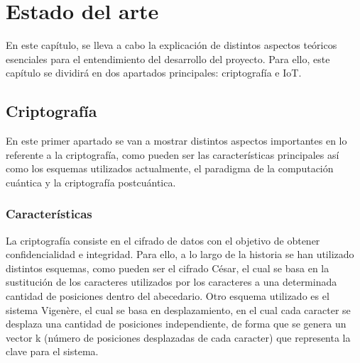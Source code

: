 %
%
%
% 
%
%
%
%

\chapter{Estado del arte}\label{cha:estado-arte}

En este capítulo, se lleva a cabo la explicación de distintos aspectos teóricos esenciales para el entendimiento del desarrollo del proyecto.
Para ello, este capítulo se dividirá en dos apartados principales: criptografía e \ac{IoT}.


\section{Criptografía}\label{sec:criptografia}

En este primer apartado se van a mostrar distintos aspectos importantes en lo referente a la criptografía, como pueden ser las características principales así como los esquemas utilizados actualmente, el paradigma de la computación cuántica y la criptografía postcuántica.


\subsection{Características}\label{subsec:caracteristicas}

La criptografía consiste en el cifrado de datos con el objetivo de obtener confidencialidad e integridad.
Para ello, a lo largo de la historia se han utilizado distintos esquemas, como pueden ser el cifrado César, el cual se basa en la sustitución de los caracteres utilizados por los caracteres a una determinada cantidad de posiciones dentro del abecedario.
Otro esquema utilizado es el sistema Vigenère, el cual se basa en desplazamiento, en el cual cada caracter se desplaza una cantidad de posiciones independiente, de forma que se genera un vector k (número de posiciones desplazadas de cada caracter) que representa la clave para el sistema.


